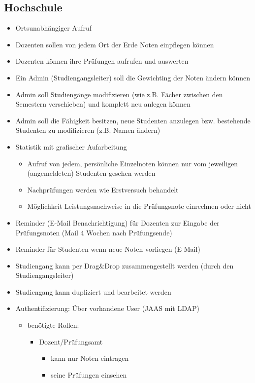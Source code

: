 \documentclass[12pt,a4paper,parskip]{scrreprt}
\begin{document}
\subsection{Hochschule}
\begin{itemize}
\item Ortsunabhängiger Aufruf
\item Dozenten sollen von jedem Ort der Erde Noten einpflegen können
\item Dozenten können ihre Prüfungen aufrufen und auswerten
\item Ein Admin (Studiengangsleiter) soll die Gewichting der Noten ändern können
\item Admin soll Studiengänge modifizieren (wie z.B. Fächer zwischen den Semestern verschieben) und komplett neu anlegen können
\item Admin soll die Fähigkeit besitzen, neue Studenten anzulegen bzw. bestehende Studenten zu modifizieren (z.B. Namen ändern)
\item Statistik mit grafischer Aufarbeitung
\begin{itemize}
\item Aufruf von jedem, persönliche Einzelnoten können nur vom jeweiligen (angemeldeten) Studenten gesehen werden
\item Nachprüfungen werden wie Erstversuch behandelt
\item Möglichkeit Leistungsnachweise in die Prüfungsnote einrechnen oder nicht
\end{itemize}
\item Reminder (E-Mail Benachrichtigung) für Dozenten zur Eingabe der Prüfungsnoten (Mail 4 Wochen nach Prüfungsende)
\item Reminder für Studenten wenn neue Noten vorliegen (E-Mail)
\item Studiengang kann per Drag\&Drop zusammengestellt werden (durch den Studiengangsleiter)
\item Studiengang kann dupliziert und bearbeitet werden
\item Authentifizierung: Über vorhandene User (JAAS mit LDAP)
\begin{itemize}
\item benötigte Rollen:
\begin{itemize}
\item Dozent/Prüfungsamt
\begin{itemize}
\item kann nur Noten eintragen
\item seine Prüfungen einsehen
\end{itemize}

\end{itemize}
\end{itemize}
\end{itemize}
\end{document}
